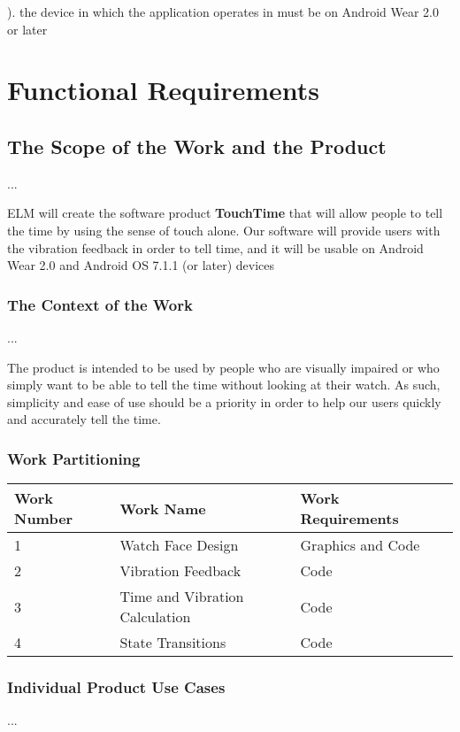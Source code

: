 \documentclass[12pt, titlepage]{article}
\begin{document}
). the device in which the application operates in must be on Android Wear 2.0 or later

\section{Functional Requirements}

\subsection{The Scope of the Work and the Product}
...

ELM will create the software product \textbf{TouchTime} that will allow people to tell the time by using the sense of touch alone. Our software will provide users with the vibration feedback in order to tell time, and it will be usable on Android Wear 2.0 and Android OS 7.1.1 (or later) devices

\subsubsection{The Context of the Work}
...

The product is intended to be used by people who are visually impaired or who simply want to be able to tell the time without looking at their watch. As such, simplicity and ease of use should be a priority in order to help our users quickly and accurately tell the time.

\subsubsection{Work Partitioning}

\begin{center}
    \begin{tabular}{| l | l | l | p{5cm} | }
    \hline
    Work Number & Work Name & Work Requirements \\ \hline
    1 & Watch Face Design & Graphics and Code \\ \hline
    2 & Vibration Feedback & Code \\ \hline
    3 & Time and Vibration Calculation & Code \\ \hline
    4 & State Transitions & Code \\ \hline
    \end{tabular}
\end{center}

\subsubsection{Individual Product Use Cases}
...
\end{document}
